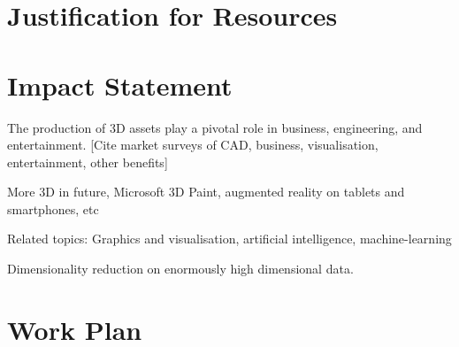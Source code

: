\documentclass[a4paper, fontsize=15pt, onecolumn]{article} %
\numberwithin{equation}{section} %
\numberwithin{figure}{section} %
\numberwithin{table}{section} %
\begin{document}
\newpage

\section*{Justification for Resources}

\newpage

\section*{Impact Statement}
The production of 3D assets play a pivotal role in business, engineering, and entertainment.
[Cite market surveys of CAD, business, visualisation, entertainment, other benefits]

More 3D in future, Microsoft 3D Paint, augmented reality on tablets and smartphones, etc

Related topics: Graphics and visualisation, artificial intelligence, machine-learning

Dimensionality reduction on enormously high dimensional data.

\newpage

\section*{Work Plan}
\end{document}
